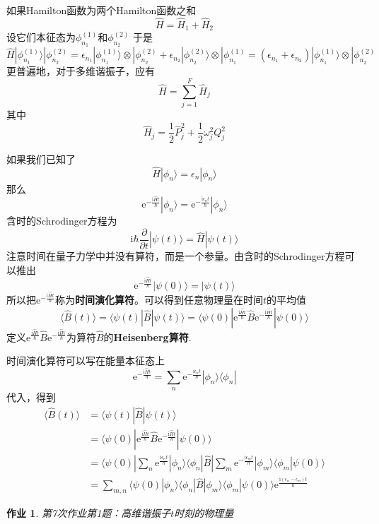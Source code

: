 \documentclass[12pt]{article}
\newtheorem{asg}{作业}
\begin{document}
如果Hamilton函数为两个Hamilton函数之和
\[ \hat{H} = \hat{H}_1 + \hat{H}_2 \]
设它们本征态为$\phi_{n_1}^{(1)}$和$\phi_{n_2}^{(2)}$
于是
\[\hat{H} |\phi_{n_1}^{(1)} \rangle |\phi_{n_2}^{(2)} = \epsilon_{n_1}|\phi_{n_1}^{(1)} \rangle \otimes |\phi_{n_2}^{(2)} + \epsilon_{n_2}|\phi_{n_2}^{(2)} \rangle \otimes |\phi_{n_1}^{(1)} = (\epsilon_{n_1}+\epsilon_{n_2})|\phi_{n_1}^{(1)} \rangle \otimes |\phi_{n_2}^{(2)}\]
更普遍地，对于多维谐振子，应有
\[ \hat{H} = \sum_{j=1}^F \hat{H}_j \]
其中 
\[ \hat{H}_j = \frac 12 \hat{P}_j^2 + \frac 12 \omega_j^2 Q_j^2 \]

如果我们已知了
\[ \hat{H}|\phi_n\rangle = \epsilon_n|\phi_n\rangle \]
那么
\[ \mathrm{e}^{-\frac {\mathrm{i}\hat{H}t}{\hbar}}|\phi_n\rangle = \mathrm{e}^{-\frac {\mathrm{i}\epsilon_n t}{\hbar}}|\phi_n\rangle \]
含时的Schrodinger方程为
\[ \mathrm{i}\hbar \frac {\partial}{\partial t}|\psi(t)\rangle = \hat{H} |\psi(t)\rangle \]
注意时间在量子力学中并没有算符，而是一个参量。由含时的Schrodinger方程可以推出
\[ \mathrm{e}^{-\frac {\mathrm{i}\hat{H}t}{\hbar}}|\psi(0)\rangle = |\psi(t) \rangle \]
所以把$\mathrm{e}^{-\frac {\mathrm{i}\hat{H}t}{\hbar}}$称为\textbf{时间演化算符}。可以得到任意物理量在时间$t$的平均值 
\[ \langle \hat{B}(t) \rangle = \langle \psi(t)|\hat{B} | \psi(t) \rangle = \langle \psi(0) |\mathrm{e}^{\frac {\mathrm{i}\hat{H}t}{\hbar}} \hat{B} \mathrm{e}^{-\frac {\mathrm{i}\hat{H}t}{\hbar}}|\psi(0) \rangle \]
定义$\mathrm{e}^{\frac {\mathrm{i}\hat{H}t}{\hbar}} \hat{B} \mathrm{e}^{-\frac {\mathrm{i}\hat{H}t}{\hbar}}$为算符$\hat{B}$的\textbf{Heisenberg算符}.

时间演化算符可以写在能量本征态上
\[ \mathrm{e}^{-\frac {\mathrm{i}\hat{H}t}{\hbar}} = \sum_n \mathrm{e}^{-\frac {\mathrm{i}\epsilon_n t}{\hbar}} |\phi_n \rangle \langle\phi_n| \]
代入，得到 
\begin{align*}
    \langle \hat{B}(t) \rangle &= \langle \psi(t)|\hat{B} | \psi(t) \rangle\\
    &= \langle \psi(0) |\mathrm{e}^{\frac {\mathrm{i}\hat{H}t}{\hbar}} \hat{B} \mathrm{e}^{-\frac {\mathrm{i}\hat{H}t}{\hbar}}|\psi(0) \rangle\\
    &= \langle \psi(0) |\sum_n \mathrm{e}^{\frac {\mathrm{i}\epsilon_n t}{\hbar}} |\phi_n \rangle \langle\phi_n|\hat{B}|\sum_m \mathrm{e}^{-\frac {\mathrm{i}\epsilon_m t}{\hbar}} |\phi_m \rangle \langle\phi_m|\psi(0)\rangle\\
    &= \sum_{m,n} \langle \psi(0)|\phi_n\rangle \langle \phi_n|\hat{B}|\phi_m \rangle \langle \phi_m|\psi(0)\rangle \mathrm{e}^{\frac {\mathrm{i}(\epsilon_n-\epsilon_m)t}{\hbar}}
\end{align*}
\begin{asg}
    第7次作业第1题：高维谐振子$t$时刻的物理量
\end{asg}
\end{document}
